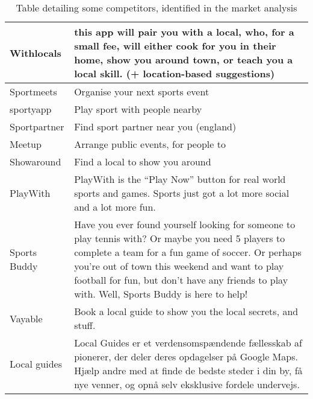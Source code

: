 \begin{table}[H]
\centering
\caption{Table detailing some competitors, identified in the market analysis}
	\begin{tabularx}{\textwidth}{|l|X|}
\hline
\rowcolor[HTML]{C0C0C0} Withlocals & this app will pair you with a local, who, for a small fee, will either cook for you in their home, show you around town, or teach you a local skill. (+ location-based suggestions) \\ \hline
Sportmeets & Organise your next sports event \\ \hline
\rowcolor[HTML]{C0C0C0} sportyapp & Play sport with people nearby \\ \hline
Sportpartner & Find sport partner near you (england) \\ \hline
\rowcolor[HTML]{C0C0C0} Meetup & Arrange public events, for people to \\ \hline
Showaround & Find a local to show you around \\ \hline
\rowcolor[HTML]{C0C0C0} PlayWith & PlayWith is the “Play Now” button for real world sports and games. Sports just got a lot more social and a lot more fun. \\ \hline
Sports Buddy & Have you ever found yourself looking for someone to play tennis with? Or maybe you need 5 players to complete a team for a fun game of soccer. Or perhaps you're out of town this weekend and want to play football for fun, but don't have any friends to play with. Well, Sports Buddy is here to help! \\ \hline
\rowcolor[HTML]{C0C0C0} Vayable & Book a local guide to show you the local secrets, and stuff. \\ \hline
Local guides & Local Guides er et verdensomspændende fællesskab af pionerer, der deler deres opdagelser på Google Maps. Hjælp andre med at finde de bedste steder i din by, få nye venner, og opnå selv eksklusive fordele undervejs. \\ \hline
\end{tabularx}
\end{table}
